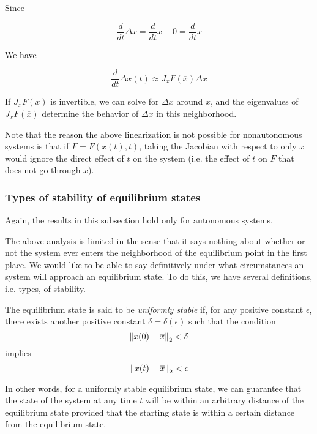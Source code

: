 Since

\begin{equation*}
  \frac{d}{dt}\Delta x = \frac{d}{dt} x - 0 = \frac{d}{dt} x
\end{equation*}

We have

\begin{equation*}
\frac{d}{dt}\Delta x(t) \approx J_x F(\overline{x}) \Delta x
\end{equation*}

If $J_x F(\overline{x})$ is invertible, we can solve for $\Delta x$ around $\overline{x}$, and the eigenvalues of $J_x F(\overline{x})$ determine the behavior of $\Delta x$ in this neighborhood.

Note that the reason the above linearization is not possible for nonautonomous systems is that if $F = F(x(t), t)$, taking the Jacobian with respect to only $x$ would ignore the direct effect of $t$ on the system (i.e. the effect of $t$ on $F$ that does not go through $x$).

\subsubsection{Types of stability of equilibrium states}

Again, the results in this subsection hold only for autonomous systems.

The above analysis is limited in the sense that it says nothing about whether or not the system ever enters the neighborhood of the equilibrium point in the first place. We would like to be able to say definitively under what circumstances an system will approach an equilibrium state. To do this, we have several definitions, i.e. types, of stability.

\begin{definition}
  The equilibrium state is said to be \emph{uniformly stable} if, for any positive constant $\epsilon$, there exists another positive constant $\delta = \delta(\epsilon)$ such that the condition
  \begin{equation*}
    \left\lVert x(0) - \overline{x} \right\rVert_2 < \delta
  \end{equation*}
  implies 
  \begin{equation*}
    \left\lVert x(t) - \overline{x} \right\rVert_2 < \epsilon
  \end{equation*}
  \cite[p. 681]{Haykin:2009:NNC:1213811}
\end{definition}

In other words, for a uniformly stable equilibrium state, we can guarantee that the state of the system at any time $t$ will be within an arbitrary distance of the equilibrium state provided that the starting state is within a certain distance from the equilibrium state.

